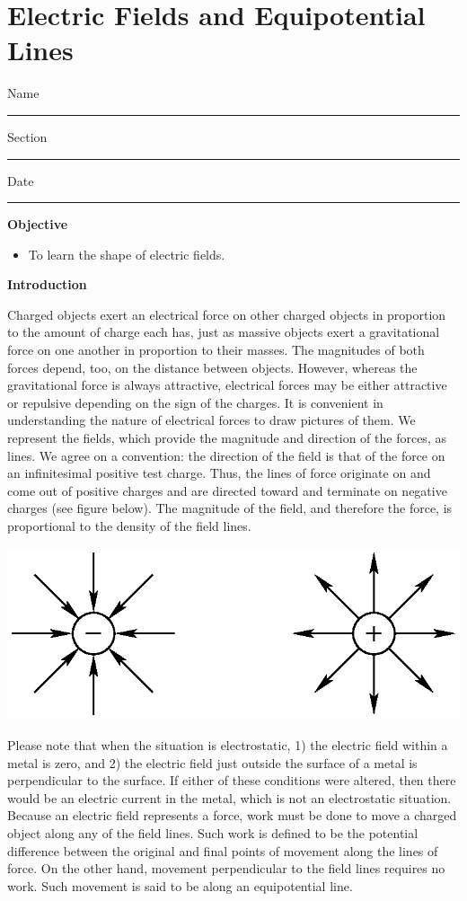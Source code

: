 
\section{Electric Fields and Equipotential Lines}

Name \rule{2.0in}{0.1pt}\hfill{}Section \rule{1.0in}{0.1pt}\hfill{}Date
\rule{1.0in}{0.1pt}

\textbf{Objective}

\begin{itemize}
\item To learn the shape of electric fields.
\end{itemize}
\textbf{Introduction}

Charged objects exert an electrical force on other charged objects
in proportion to the amount of charge each has, just as massive objects
exert a gravitational force on one another in proportion to their
masses. The magnitudes of both forces depend, too, on the distance
between objects. However, whereas the gravitational force is always
attractive, electrical forces may be either attractive or repulsive
depending on the sign of the charges. It is convenient in understanding
the nature of electrical forces to draw pictures of them. We represent
the fields, which provide the magnitude and direction of the forces,
as lines. We agree on a convention: the direction of the field is
that of the force on an infinitesimal positive test charge. Thus,
the lines of force originate on and come out of positive charges and
are directed toward and terminate on negative charges (see figure
below). The magnitude of the field, and therefore the force, is proportional
to the density of the field lines.

\vspace{0.3cm}
{\centering \includegraphics{ef_equipot_lines_fig_1.eps} \par}
\vspace{0.3cm}

Please note that when the situation is electrostatic, 1) the electric
field within a metal is zero, and 2) the electric field just outside
the surface of a metal is perpendicular to the surface. If either
of these conditions were altered, then there would be an electric
current in the metal, which is not an electrostatic situation. Because
an electric field represents a force, work must be done to move a
charged object along any of the field lines. Such work is defined
to be the potential difference between the original and final points
of movement along the lines of force. On the other hand, movement
perpendicular to the field lines requires no work. Such movement is
said to be along an equipotential line.

